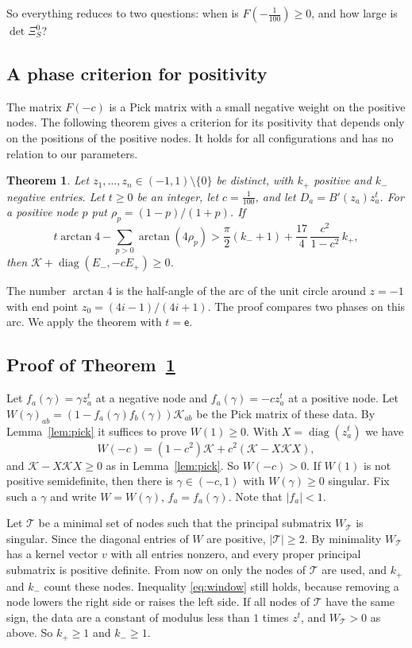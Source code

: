 \documentclass[11pt]{amsart}
\newtheorem{theorem}{Theorem}[section]
\theoremstyle{definition}
\theoremstyle{remark}
\numberwithin{equation}{section}
\newcommand{\cK}{\mathcal K}
\begin{document}
So everything reduces to two questions: when is $F(-\frac1{100})\ge0$, and how large is $\det\Xi^0_S$?

\subsection{A phase criterion for positivity}\label{ssec:window}
The matrix $F(-c)$ is a Pick matrix with a small negative weight on the positive nodes. The following theorem
gives a criterion for its positivity that depends only on the positions of the positive nodes. It holds for
all configurations and has no relation to our parameters.

\begin{theorem}\label{thm:window}
Let $z_1,\ldots,z_n\in(-1,1)\setminus\{0\}$ be distinct, with $k_+$ positive and $k_-$ negative entries. Let
$t\ge0$ be an integer, let $c=\frac1{100}$, and let $D_a=B'(z_a)z_a^t$. For a positive node $p$ put
$\rho_p=(1-p)/(1+p)$. If
\begin{equation}\label{eq:window}
 t\arctan4-\sum_{p>0}\arctan(4\rho_p)>\frac{\pi}{2}(k_-+1)+\frac{17}4\,\frac{c^2}{1-c^2}\,k_+,
\end{equation}
then $\cK+\operatorname{diag}(E_-,-cE_+)\ge0$.
\end{theorem}

The number $\arctan4$ is the half-angle of the arc of the unit circle around $z=-1$ with end point
$z_0=(4i-1)/(4i+1)$. The proof compares two phases on this arc. We apply the theorem with $t=\mathsf e$.

\subsection{Proof of Theorem~\ref{thm:window}}\label{ssec:windowproof}
Let $f_a(\gamma)=\gamma z_a^t$ at a negative node and $f_a(\gamma)=-cz_a^t$ at a positive node. Let
$W(\gamma)_{ab}=(1-f_a(\gamma)f_b(\gamma))\cK_{ab}$ be the Pick matrix of these data. By Lemma~\ref{lem:pick} it suffices to prove
$W(1)\ge0$. With $X=\operatorname{diag}(z_a^t)$ we have
\[
 W(-c)=(1-c^2)\cK+c^2(\cK-X\cK X),
\]
and $\cK-X\cK X\ge0$ as in Lemma~\ref{lem:pick}. So $W(-c)>0$. If $W(1)$ is not positive semidefinite, then there is
$\gamma\in(-c,1)$ with $W(\gamma)\ge0$ singular. Fix such a $\gamma$ and write $W=W(\gamma)$, $f_a=f_a(\gamma)$. Note that $|f_a|<1$.

Let $\mathcal T$ be a minimal set of nodes such that the principal submatrix $W_{\mathcal T}$ is singular. Since the diagonal entries of $W$ are
positive, $|\mathcal T|\ge2$. By minimality $W_{\mathcal T}$ has a kernel vector $v$ with all entries nonzero, and every proper principal
submatrix is positive definite. From now on only the nodes of $\mathcal T$ are used, and $k_+$ and $k_-$ count these nodes.
Inequality \eqref{eq:window} still holds, because removing a node lowers the right side or raises the left side. If all nodes of $\mathcal T$ have
the same sign, the data are a constant of modulus less than $1$ times $z^t$, and $W_{\mathcal T}>0$ as above. So $k_+\ge1$ and $k_-\ge1$.
\end{document}
